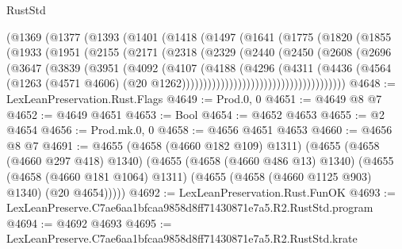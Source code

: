 \begin{lexlean}{RustStd}
\begin{coremodule}
                (@1369
                  (@1377
                    (@1393
                      (@1401
                        (@1418
                          (@1497
                            (@1641
                              (@1775
                                (@1820
                                  (@1855
                                    (@1933
                                      (@1951
                                        (@2155
                                          (@2171
                                            (@2318
                                              (@2329
                                                (@2440
                                                  (@2450
                                                    (@2608
                                                      (@2696
                                                        (@3647
                                                          (@3839
                                                            (@3951
                                                              (@4092
                                                                (@4107
                                                                  (@4188
                                                                    (@4296
                                                                      (@4311
                                                                        (@4436
                                                                          (@4564
                                                                            (@1263
                                                                              (@4571 @4606)
                                                                              (@20
                                                                                @1262))))))))))))))))))))))))))))))))))))))
@4648 := LexLeanPreservation.Rust.Flags
@4649 := Prod.{0, 0}
@4651 := @4649 @8 @7
@4652 := @4649 @4651
@4653 := Bool
@4654 := @4652 @4653
@4655 := @2 @4654
@4656 := Prod.mk.{0, 0}
@4658 := @4656 @4651 @4653
@4660 := @4656 @8 @7
@4691 := @4655
    (@4658 (@4660 @182 @109) @1311)
    (@4655
      (@4658 (@4660 @297 @418) @1340)
      (@4655
        (@4658 (@4660 @486 @13) @1340)
        (@4655
          (@4658 (@4660 @181 @1064) @1311)
          (@4655 (@4658 (@4660 @1125 @903) @1340) (@20 @4654)))))
@4692 := LexLeanPreservation.Rust.FunOK
@4693 := LexLeanPreserve.C7ae6aa1bfcaa9858d8ff71430871e7a5.R2.RustStd.program
@4694 := @4692 @4693
@4695 := LexLeanPreserve.C7ae6aa1bfcaa9858d8ff71430871e7a5.R2.RustStd.krate

\end{coremodule}
\end{lexlean}
